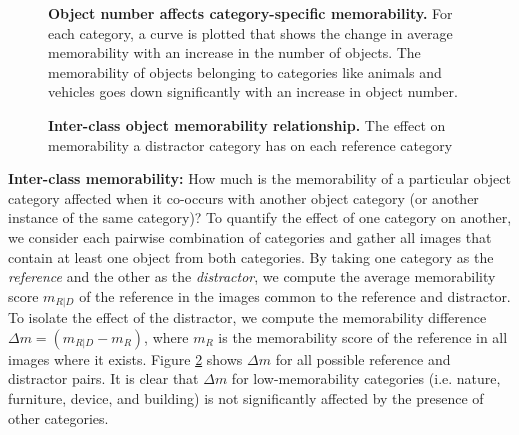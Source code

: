 \begin{figure}[!t]
\centering
{}
\vspace{-5mm}\caption{\footnotesize\textbf{Object number affects category-specific memorability.} For each category, a curve is plotted that shows the change in average memorability with an increase in the number of objects. The memorability of objects belonging to categories like animals and vehicles goes down significantly with an increase in object number.}\label{fig:obLabelChange}
\end{figure}

\begin{figure}[!b]
\centering
{}
\vspace{-5mm}\caption{\footnotesize\textbf{Inter-class object memorability relationship.} The effect on memorability a distractor category has on each reference category }\label{fig:obLabelPair}
\end{figure}

\vspace{3pt}\noindent\textbf{Inter-class memorability:} How much is the memorability of a particular object category affected when it co-occurs with another object category (or another instance of the same category)? To quantify the effect of one category on another, we consider each pairwise combination of categories and gather all images that contain at least one object from both categories. By taking one category as the \emph{reference} and the other as the \emph{distractor}, we compute the average memorability score $m_{R|D}$ of the reference in the  images common to the reference and distractor. To isolate the effect of the distractor, we compute the memorability difference $\Delta m=(m_{R|D}-m_R)$, where $m_R$ is the memorability score of the reference in all images where it exists. Figure \ref{fig:obLabelPair} shows $\Delta m$ for all possible reference and distractor pairs. It is clear that  $\Delta m$ for low-memorability categories (i.e. nature, furniture, device, and building) is not significantly affected by the presence of other categories. %



